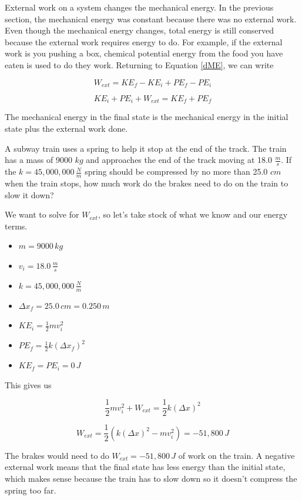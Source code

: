 \documentclass[12pt]{book}
\begin{document}
External work on a system changes the mechanical energy. In the previous section, the mechanical energy was constant because there was no external work. Even though the mechanical energy changes, total energy is still conserved because the external work requires energy to do. For example, if the external work is you pushing a box, chemical potential energy from the food you have eaten is used to do they work. Returning to Equation \ref{dME}, we can write

\begin{equation}
W_{ext} = KE_f - KE_i + PE_f - PE_i
\end{equation}

\begin{equation}
KE_i + PE_i + W_{ext} = KE_f + PE_f
\label{wext}
\end{equation}

The mechanical energy in the final state is the mechanical energy in the initial state plus the external work done.

\begin{exampleblock}

A subway train uses a spring to help it stop at the end of the track. The train has a mass of 9000 $kg$ and approaches the end of the track moving at 18.0 $\frac{m}{s}$. If the $k = 45,000,000 \, \frac{N}{m}$ spring should be compressed by no more than 25.0 $cm$ when the train stops, how much work do the brakes need to do on the train to slow it down?

\hspace{10pt}

We want to solve for $W_{ext}$, so let's take stock of what we know and our energy terms.

\begin{itemize}
\item $m = 9000 \, kg$
\item $v_i = 18.0 \, \frac{m}{s}$
\item $k = 45,000,000 \, \frac{N}{m}$
\item $\Delta x_f = 25.0 \, cm = 0.250 \, m$
\item $KE_i = \frac{1}{2} m v_i^2$
\item $PE_f = \frac{1}{2} k (\Delta x_f)^2$
\item $KE_f = PE_i = 0 \, J$
\end{itemize}

This gives us

\begin{equation}
\frac{1}{2} m v_i^2 + W_{ext} = \frac{1}{2} k (\Delta x)^2
\end{equation}

\begin{equation}
W_{ext} = \frac{1}{2} (k (\Delta x)^2 - m v_i^2) = -51,800 \, J
\end{equation}

The brakes would need to do $W_{ext} = -51,800 \, J$ of work on the train. A negative external work means that the final state has less energy than the initial state, which makes sense because the train has to slow down so it doesn't compress the spring too far.

\end{exampleblock}
\end{document}
